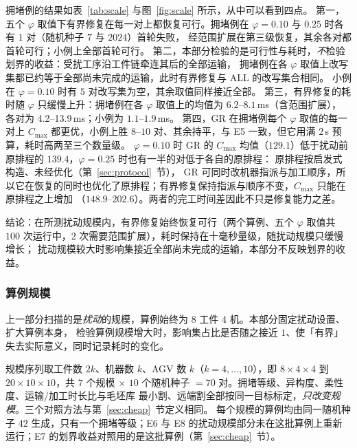 \documentclass[manuscript,screen,review]{acmart}
\newcommand{\NSeeds}{10}
\newcommand{\ScaleMsMin}{4.2}       %
\newcommand{\ScaleMsMax}{13.9}      %
\newcommand{\ScaleKs}{7}
\newcommand{\ScalePairs}{70}
\newcommand{\ScaleJobsHi}{20}
\newcommand{\ScaleMachHi}{10}
\begin{document}
拥堵例的结果如表~\ref{tab:scale} 与图~\ref{fig:scale} 所示，从中可以看到四点。
第一，五个 \(\varphi\) 取值下有界修复在每一对上都恢复可行。拥堵例在 \(\varphi=0.10\) 与 \(0.25\) 时各有 \(1\) 对（随机种子 \(7\) 与 \(2024\)）首轮失败，
经范围扩展在第三级恢复，其余各对都首轮可行；小例上全部首轮可行。
第二，本部分检验的是可行性与耗时，\emph{不}检验划界的收益：受扰工序沿工件链牵连其后的全部运输，
拥堵例在各 \(\varphi\) 取值上改写集都已约等于全部尚未完成的运输，此时有界修复与 ALL 的改写集合相同。
小例在 \(\varphi=0.10\) 时有 \(5\) 对改写集为空，其余取值同样接近全部。
第三，有界修复的耗时随 \(\varphi\) 只缓慢上升：拥堵例在各 \(\varphi\) 取值上的均值为 \(6.2\)--\(8.1\)\,ms（含范围扩展），
各对为 \ScaleMsMin--\ScaleMsMax\,ms；小例为 \(1.1\)--\(1.9\)\,ms。
第四，GR 在拥堵例每个 \(\varphi\) 取值的每一对上 \(C_{\max}\) 都更优，小例上胜 \(8\)--\(10\) 对、其余持平，与 E5 一致，但它用满 \(2\)\,s 预算，耗时高两至三个数量级。
\(\varphi=0.10\) 时 GR 的 \(C_{\max}\) 均值（\(129.1\)）低于扰动前原排程的 \(139.4\)，\(\varphi=0.25\) 时也有一半的对低于各自的原排程：
原排程按启发式构造、未经优化（第~\ref{sec:protocol}~节），
GR 可同时改机器指派与加工顺序，所以它在恢复的同时也优化了原排程；有界修复保持指派与顺序不变，\(C_{\max}\) 只能在原排程之上增加
（\(148.9\)--\(202.6\)）。两者的完工时间差因此不只是修复能力之差。

结论：在所测扰动规模内，有界修复始终恢复可行（两个算例、五个 \(\varphi\) 取值共 \(100\) 次运行中，\(2\) 次需要范围扩展），耗时保持在十毫秒量级，随扰动规模只缓慢增长；
扰动规模较大时影响集接近全部尚未完成的运输，本部分不反映划界的收益。

\subsubsection{算例规模}
\label{sec:instscale}

上一部分扫描的是\emph{扰动}的规模，算例始终为 \(8\) 工件 \(4\) 机。本部分固定扰动设置、扩大算例本身，
检验算例规模增大时，影响集占比是否随之接近 \(1\)、使「有界」失去实际意义，同时记录耗时的变化。

规模序列取工件数 \(2k\)、机器数 \(k\)、AGV 数 \(k\)（\(k=4,\dots,10\)），即 \(8\times4\times4\) 到
\(\ScaleJobsHi\times\ScaleMachHi\times\ScaleMachHi\)，共 \(\ScaleKs\) 个规模 \(\times\)
\(\NSeeds\) 个随机种子 \(=\ScalePairs\) 对。拥堵等级、异构度、柔性度、运输/加工时长比与毛坯库
最小割、远端割全部按同一目标标定，\emph{只改变规模}。三个对照方法与第~\ref{sec:cheap}~节定义相同。
每个规模的算例均由同一随机种子 \(42\) 生成，只有一个拥堵等级；E6 与 E8 的扰动规模部分未在这批算例上重新运行；E7 的划界收益对照用的是这批算例（第~\ref{sec:cheap}~节）。
\end{document}
